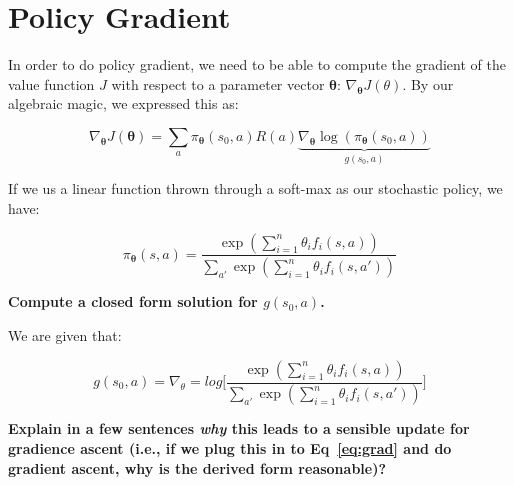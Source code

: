 \documentclass[fleqn]{hw}
\begin{document}
\section{Policy Gradient}

In order to do policy gradient, we need to be able
to compute the gradient of the value function $J$ with respect
to a parameter vector ${\mathbf \theta}$: $\nabla_{\mathbf \theta} J(\theta)$.  By
our algebraic magic, we expressed this as:

\begin{equation} \label{eq:grad}
\nabla_{\mathbf \theta} J(\mathbf \theta) 
  = \sum_a \pi_{\mathbf \theta}(s_0,a) R(a) 
             \underbrace{\nabla_{\mathbf \theta} \log \left( \pi_{\mathbf \theta}(s_0,a) \right)}_{g(s_0,a)}
\end{equation}

If we us a linear function thrown through a soft-max as our stochastic
policy, we have:

\begin{equation}
\pi_{\mathbf \theta}(s,a) 
  = \frac {\exp \left( \sum_{i=1}^n \theta_i f_i(s,a) \right)}
          {\sum_{a'} \exp \left( \sum_{i=1}^n \theta_i f_i(s,a') \right)}
\end{equation}

{\bf Compute a closed form solution for $g(s_0,a)$.} 

We are given that:

$$g(s_0, a) = \nabla_\theta = log\bigg[\frac {\exp \left( \sum_{i=1}^n \theta_i f_i(s,a) \right)}
          {\sum_{a'} \exp \left( \sum_{i=1}^n \theta_i f_i(s,a') \right)}
\bigg]$$


{\bf Explain in a few
sentences \emph{why} this leads to a sensible update for gradience
ascent (i.e., if we plug this in to Eq~\eqref{eq:grad} and do gradient
ascent, why is the derived form reasonable)?}
\end{document}
